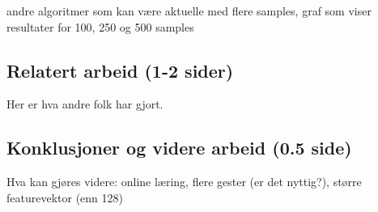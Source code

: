{\color{red} andre algoritmer som kan være aktuelle med flere samples, graf som viser resultater for 100, 250 og 500 samples}

\subsection{Relatert arbeid (1-2 sider)}
Her er hva andre folk har gjort.

\subsection{Konklusjoner og videre arbeid (0.5 side)}
Hva kan gjøres videre: online læring, flere gester (er det nyttig?), større featurevektor (enn 128)




